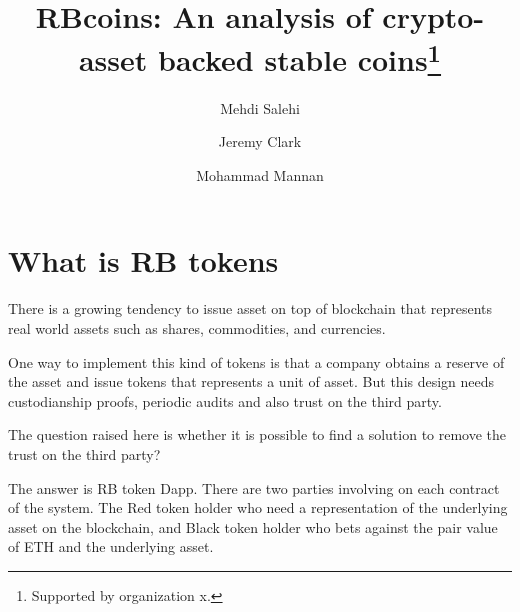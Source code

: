 \documentclass[runningheads]{llncs}
\begin{document}
%
\title{RBcoins: An analysis of crypto-asset backed stable coins\thanks{Supported by organization x.}}
%
%
\author{Mehdi Salehi \and
Jeremy Clark\and
Mohammad Mannan}
%
%
%
\maketitle              %
%
\begin{abstract}



\end{abstract}


%
%
%
\section{What is RB tokens}

There is a growing tendency to issue asset on top of blockchain that represents  real world assets such as shares, commodities, and currencies. 

One way to implement this kind of tokens is that a company obtains a reserve of the asset and issue tokens that represents a unit of asset. But this design needs custodianship proofs, periodic audits and also trust on the third party.

The question raised here is whether it is possible to find a solution to remove the trust on the third party?

The answer is RB token Dapp. There are two parties involving on each contract of the system. The Red token holder who need a representation of the underlying asset on the blockchain, and Black token holder who bets against the pair value of ETH and the underlying asset.
\end{document}
